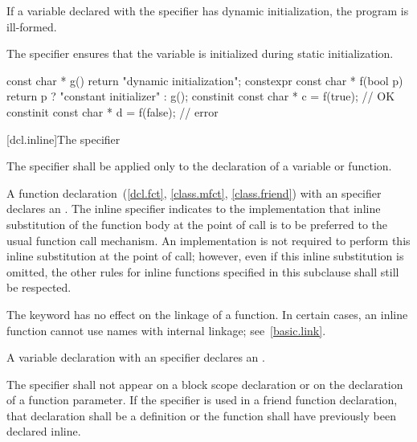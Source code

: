 \pnum
If a variable declared with the  specifier has
dynamic initialization, the program is ill-formed.
\begin{note}
The  specifier ensures that the variable
is initialized during static initialization.
\end{note}

\pnum
\begin{example}
\begin{codeblock}
const char * g() { return "dynamic initialization"; }
constexpr const char * f(bool p) { return p ? "constant initializer" : g(); }
constinit const char * c = f(true);     // OK
constinit const char * d = f(false);    // error
\end{codeblock}
\end{example}

[dcl.inline]{The  specifier}%

\pnum
The  specifier shall be applied only to the declaration
of a variable or function.

\pnum
{}%
%
A function declaration~(\ref{dcl.fct}, \ref{class.mfct},
\ref{class.friend}) with an  specifier declares an
. The inline specifier indicates to
the implementation that inline substitution of the function body at the
point of call is to be preferred to the usual function call mechanism.
An implementation is not required to perform this inline substitution at
the point of call; however, even if this inline substitution is omitted,
the other rules for inline functions specified in this subclause shall
still be respected.
\begin{note}
The  keyword has no effect on the linkage of a function.
In certain cases, an inline function cannot use names with internal linkage;
see~\ref{basic.link}.
\end{note}

\pnum
A variable declaration with an  specifier declares an
.

\pnum
The  specifier shall not appear on a block scope declaration or
on the declaration of a function parameter.
If the  specifier is used in a friend function declaration, that
declaration shall be a definition or the function shall have previously
been declared inline.

